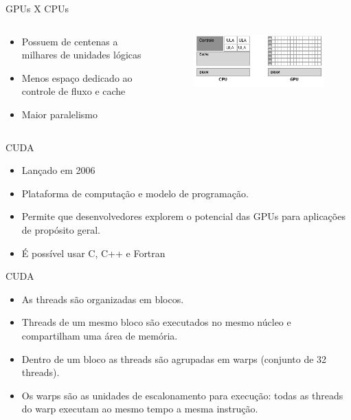 \documentclass{beamer}
\begin{document}
\begin{frame}{GPUs X CPUs}
\begin{columns}
\begin{column}{0.44\textwidth}
\begin{itemize}
    \item Possuem de centenas a milhares de unidades lógicas
    \item Menos espaço dedicado ao controle de fluxo e cache
    \item Maior paralelismo
\end{itemize}
\end{column}
\begin{column}{0.54\textwidth}
\begin{figure}
    \centering
    \includegraphics[width=1\textwidth]{gpu_1.png}
\end{figure}
\end{column}
\end{columns}
\end{frame}

\begin{frame}{CUDA}
\begin{itemize}
    \item Lançado em 2006
    \item Plataforma de computação e modelo de programação.
    \item Permite que desenvolvedores explorem o potencial das GPUs para aplicações de propósito geral.
    \item É possível usar C, C++ e Fortran
\end{itemize}
\end{frame}

\begin{frame}{CUDA}
\begin{itemize}
    \item As threads são organizadas em blocos.
    \item Threads de um mesmo bloco são executados no mesmo núcleo e compartilham uma área de memória.
    \item Dentro de um bloco as threads são agrupadas em warps (conjunto de 32 threads).
    \item Os warps são as unidades de escalonamento para execução: todas as threads do warp executam ao mesmo tempo a mesma instrução.
\end{itemize}
\end{frame}
\end{document}
